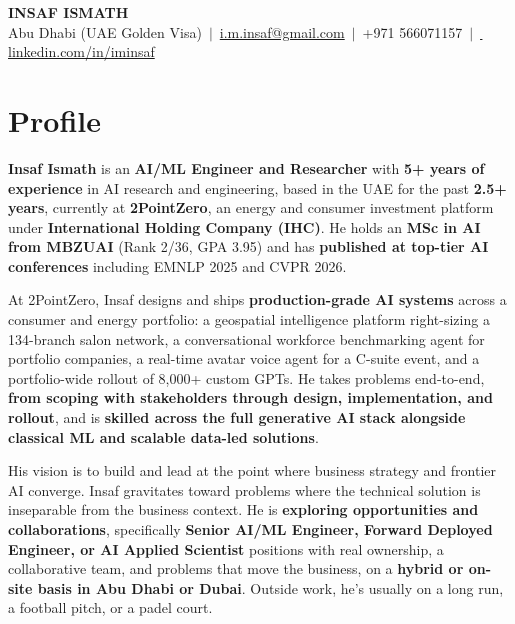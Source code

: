 \documentclass[10pt]{article}
\begin{document}
\begin{center}
    {\LARGE\bfseries\textcolor{accent}{INSAF ISMATH}} \\[4pt]
    {\small Abu Dhabi (UAE Golden Visa) \,$|$\, \href{mailto:i.m.insaf@gmail.com}{\textcolor{accentlight}{i.m.insaf@gmail.com}} \,$|$\, \textcolor{accentlight}{+971 566071157} \,$|$\, \href{https://www.linkedin.com/in/iminsaf}{\faLinkedin\, \textcolor{linkblue}{linkedin.com/in/iminsaf}}}
\end{center}

\vspace{-1pt}

\section{Profile}
\textbf{Insaf Ismath} is an \textbf{AI/ML Engineer and Researcher} with \textbf{5+ years of experience} in AI research and engineering, based in the UAE for the past \textbf{2.5+ years}, currently at \textbf{2PointZero}, an energy and consumer investment platform under \textbf{International Holding Company (IHC)}. He holds an \textbf{MSc in AI from MBZUAI} (Rank 2/36, GPA 3.95) and has \textbf{published at top-tier AI conferences} including EMNLP 2025 and CVPR 2026.

At 2PointZero, Insaf designs and ships \textbf{production-grade AI systems} across a consumer and energy portfolio: a geospatial intelligence platform right-sizing a 134-branch salon network, a conversational workforce benchmarking agent for portfolio companies, a real-time avatar voice agent for a C-suite event, and a portfolio-wide rollout of 8,000+ custom GPTs. He takes problems end-to-end, \textbf{from scoping with stakeholders through design, implementation, and rollout}, and is \textbf{skilled across the full generative AI stack alongside classical ML and scalable data-led solutions}.

His vision is to build and lead at the point where business strategy and frontier AI converge. Insaf gravitates toward problems where the technical solution is inseparable from the business context. He is \textbf{exploring opportunities and collaborations}, specifically \textbf{Senior AI/ML Engineer, Forward Deployed Engineer, or AI Applied Scientist} positions with real ownership, a collaborative team, and problems that move the business, on a \textbf{hybrid or on-site basis in Abu Dhabi or Dubai}. Outside work, he's usually on a long run, a football pitch, or a padel court.
\end{document}
